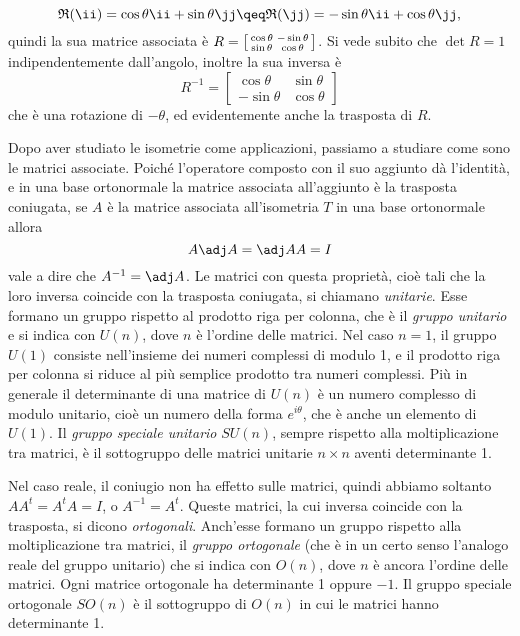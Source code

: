 \begin{equation}
	\mathfrak R(\ii)=\cos\theta\ii+\sin\theta\jj\qeq \mathfrak R(\jj)=-\sin\theta\ii+\cos\theta\jj,
	\label{eq:rotazione-base}
\end{equation}
quindi la sua matrice associata è $R=\begin{bsmallmatrix}\cos\theta&-\sin\theta\\\sin\theta&\cos\theta\end{bsmallmatrix}$.
Si vede subito che $\det R=1$ indipendentemente dall'angolo, inoltre la sua inversa è
\begin{equation}
	R^{-1}=
	\begin{bmatrix}
		\cos\theta	&\sin\theta\\
		-\sin\theta	&\cos\theta
	\end{bmatrix}
	\label{eq:rotazione-inversa-matrice}
\end{equation}
che è una rotazione di $-\theta$, ed evidentemente anche la trasposta di $R$.

Dopo aver studiato le isometrie come applicazioni, passiamo a studiare come sono le matrici associate.
Poich\'e l'operatore composto con il suo aggiunto dà l'identità, e in una base ortonormale la matrice associata all'aggiunto è la trasposta coniugata, se $A$ è la matrice associata all'isometria $T$ in una base ortonormale allora
\begin{equation*}
	A\adj A=\adj AA=I
\end{equation*}
vale a dire che $A^{-1}=\adj A$.
Le matrici con questa proprietà, cioè tali che la loro inversa coincide con la trasposta coniugata, si chiamano \emph{unitarie}.
Esse formano un gruppo rispetto al prodotto riga per colonna, che è il \emph{gruppo unitario} e si indica con $U(n)$, dove $n$ è l'ordine delle matrici.
Nel caso $n=1$, il gruppo $U(1)$ consiste nell'insieme dei numeri complessi di modulo 1, e il prodotto riga per colonna si riduce al più semplice prodotto tra numeri complessi.
Più in generale il determinante di una matrice di $U(n)$ è un numero complesso di modulo unitario, cioè un numero della forma $e^{i\theta}$, che è anche un elemento di $U(1)$.
Il \emph{gruppo speciale unitario} $SU(n)$, sempre rispetto alla moltiplicazione tra matrici, è il sottogruppo delle matrici unitarie $n\times n$ aventi determinante 1.

Nel caso reale, il coniugio non ha effetto sulle matrici, quindi abbiamo soltanto $AA^t=A^tA=I$, o $A^{-1}=A^t$.
Queste matrici, la cui inversa coincide con la trasposta, si dicono \emph{ortogonali}.
Anch'esse formano un gruppo rispetto alla moltiplicazione tra matrici, il \emph{gruppo ortogonale} (che è in un certo senso l'analogo reale del gruppo unitario) che si indica con $O(n)$, dove $n$ è ancora l'ordine delle matrici.
Ogni matrice ortogonale ha determinante 1 oppure $-1$.
Il gruppo speciale ortogonale $SO(n)$ è il sottogruppo di $O(n)$ in cui le matrici hanno determinante 1.

